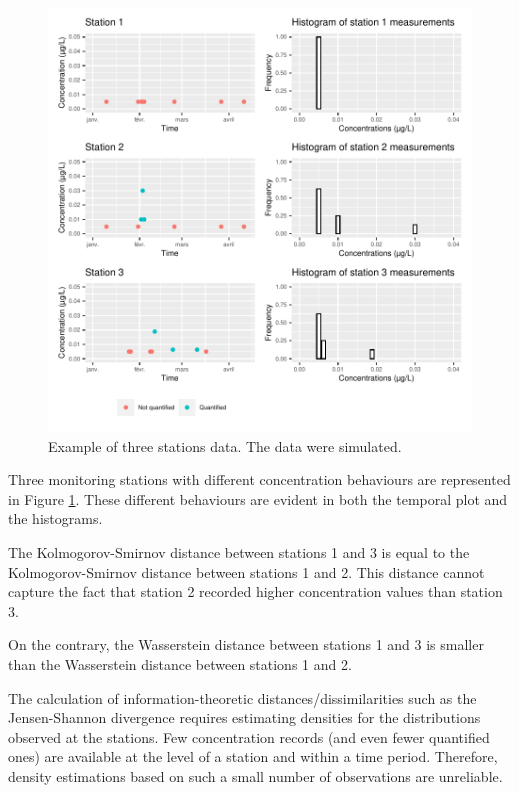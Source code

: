 \begin{figure}[htbp]
    \centering
    \includegraphics{figs/App/Simu_ex.pdf}
    \caption{Example of three stations data. The data were simulated.}
    \label{fig:ex_dist}
\end{figure}


Three monitoring stations with different concentration behaviours are represented in Figure \ref{fig:ex_dist}. These different behaviours are evident in both the temporal plot and the histograms. 

The Kolmogorov-Smirnov distance between stations 1 and 3 is equal to the Kolmogorov-Smirnov distance between stations 1 and 2. This distance cannot capture the fact that station 2 recorded higher concentration values than station 3. 

On the contrary, the Wasserstein distance between stations 1 and 3 is smaller than the Wasserstein distance between stations 1 and 2.

The calculation of information-theoretic distances/dissimilarities such as the Jensen-Shannon divergence requires estimating densities for the distributions observed at the stations. Few concentration records (and even fewer quantified ones) are available at the level of a station and within a time period. Therefore, density estimations based on such a small number of observations are unreliable.

